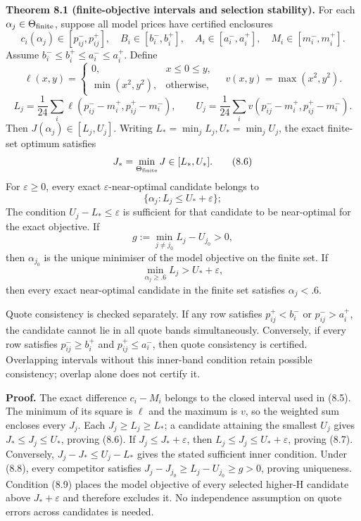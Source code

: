 \documentclass[a4paper,11pt]{article}
\begin{document}
\textbf{Theorem 8.1 (finite-objective intervals and selection stability).} For each \(\alpha_j\in\Theta_{\rm finite}\), suppose all model prices have certified enclosures
\[
c_i(\alpha_j)\in[p^-_{ij},p^+_{ij}],\quad
B_i\in[b_i^-,b_i^+],\quad
A_i\in[a_i^-,a_i^+],\quad
M_i\in[m_i^-,m_i^+].
\tag{8.4}
\]
Assume \(b_i^-\le b_i^+\le a_i^-\le a_i^+\). Define
\[
\ell(x,y)=
\begin{cases}0,&x\le0\le y,\\
\min(x^2,y^2),&\text{otherwise},\end{cases}
\quad v(x,y)=\max(x^2,y^2).
\]
\[
L_j=\frac1{24}\sum_i
\ell(p^-_{ij}-m_i^+,p^+_{ij}-m_i^-),\qquad
U_j=\frac1{24}\sum_i
v(p^-_{ij}-m_i^+,p^+_{ij}-m_i^-).
\tag{8.5}
\]
Then \(J(\alpha_j)\in[L_j,U_j]\). Writing \(L_*=\min_jL_j,U_*=\min_jU_j\), the exact finite-set optimum satisfies
\[
J_*=\min_{\Theta_{\rm finite}}J\in[L_*,U_*].
\tag{8.6}
\]
For \(\varepsilon\ge0\), every exact \(\varepsilon\)-near-optimal candidate belongs to
\[
\{\alpha_j:L_j\le U_*+\varepsilon\};
\tag{8.7}
\]
The condition \(U_j-L_*\le\varepsilon\) is sufficient for that candidate to be near-optimal for the exact objective. If
\[
g:=\min_{j\ne j_0}L_j-U_{j_0}>0,
\tag{8.8}
\]
then \(\alpha_{j_0}\) is the unique minimiser of the model objective on the finite set. If
\[
\min_{\alpha_j\ge.6}L_j>U_*+\varepsilon,
\tag{8.9}
\]
then every exact near-optimal candidate in the finite set satisfies \(\alpha_j<.6\).

Quote consistency is checked separately. If any row satisfies \(p^+_{ij}<b_i^-\) or \(p^-_{ij}>a_i^+\), the candidate cannot lie in all quote bands simultaneously. Conversely, if every row satisfies \(p^-_{ij}\ge b_i^+\) and \(p^+_{ij}\le a_i^-\), then quote consistency is certified. Overlapping intervals without this inner-band condition retain possible consistency; overlap alone does not certify it.

\textbf{Proof.} The exact difference \(c_i-M_i\) belongs to the closed interval used in (8.5). The minimum of its square is \(\ell\) and the maximum is \(v\), so the weighted sum encloses every \(J_j\). Each \(J_j\ge L_j\ge L_*\); a candidate attaining the smallest \(U_j\) gives \(J_*\le J_j\le U_*\), proving (8.6). If \(J_j\le J_*+\varepsilon\), then \(L_j\le J_j\le U_*+\varepsilon\), proving (8.7). Conversely, \(J_j-J_*\le U_j-L_*\) gives the stated sufficient inner condition. Under (8.8), every competitor satisfies \(J_j-J_{j_0}\ge L_j-U_{j_0}\ge g>0\), proving uniqueness. Condition (8.9) places the model objective of every selected higher-H candidate above \(J_*+\varepsilon\) and therefore excludes it. No independence assumption on quote errors across candidates is needed.
\end{document}
